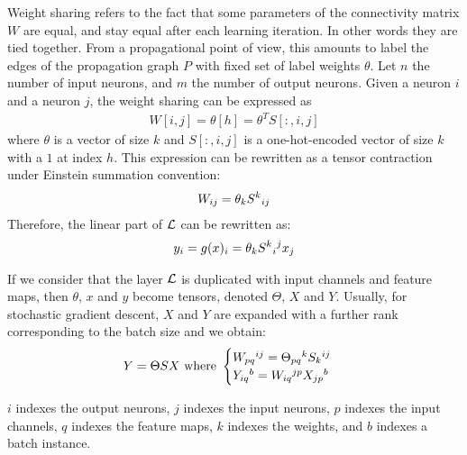 Weight sharing refers to the fact that some parameters of the connectivity matrix $W$ are equal, and stay equal after each learning iteration. In other words they are tied together. From a propagational point of view, this amounts to label the edges of the propagation graph $P$ with fixed set of label weights $\theta$. Let $n$ the number of input neurons, and $m$ the number of output neurons. Given a neuron $i$ and a neuron $j$, the weight sharing can be expressed as
\begin{gather*}
W[i,j] = \theta[h] = \theta^T S[:,i,j]
\end{gather*}
where $\theta$ is a vector of size $k$ and $S[:,i,j]$ is a one-hot-encoded vector of size $k$ with a $1$ at index $h$. This expression can be rewritten as a tensor contraction under Einstein summation convention:
\begin{gather*}
W_{ij} = \theta_k S^k \h{0}_{ij}
\end{gather*}
Therefore, the linear part of $\cl$ can be rewritten as:
\begin{gather*}
y_i = g(x)_i = \theta_k S^k \h{0}_i \h{0}^j x_j
\end{gather*}

If we consider that the layer $\cl$ is duplicated with input channels and feature maps, then $\theta$, $x$ and $y$ become tensors, denoted $\Theta$, $X$ and $Y$. Usually, for stochastic gradient descent, $X$ and $Y$ are expanded with a further rank corresponding to the batch size and we obtain:
\begin{gather*}
Y = \Theta S X
\text{ where } \begin{cases} W_{pq}\h{0}^{ij} = \Theta_{pq}\h{0}^k S_k\h{0}^{ij} \\ Y_{iq}\h{0}^b = W_{iq}\h{0}^{jp} X_{jp}\h{0}^{b} \end{cases}
\end{gather*}
\begin{remark}$i$ indexes the output neurons, $j$ indexes the input neurons, $p$ indexes the input channels, $q$ indexes the feature maps, $k$ indexes the weights, and $b$ indexes a batch instance.
\end{remark}




